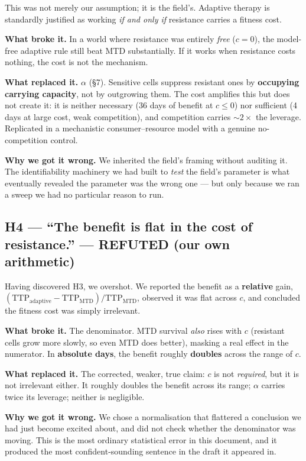 \documentclass[11pt,a4paper]{article}
\begin{document}
This was not merely our assumption; it is the field's. Adaptive therapy is standardly
justified as working \emph{if and only if} resistance carries a fitness cost.

\textbf{What broke it.} In a world where resistance was entirely \emph{free}
($c = 0$), the model-free adaptive rule still beat MTD substantially. If it works when
resistance costs nothing, the cost is not the mechanism.

\textbf{What replaced it.} $\alpha$ (\S7). Sensitive cells suppress resistant ones by
\textbf{occupying carrying capacity}, not by outgrowing them. The cost amplifies this
but does not create it: it is neither necessary (36 days of benefit at $c \leq 0$) nor
sufficient (4 days at large cost, weak competition), and competition carries
${\sim}2\times$ the leverage. Replicated in a mechanistic consumer--resource model with
a genuine no-competition control.

\textbf{Why we got it wrong.} We inherited the field's framing without auditing it. The
identifiability machinery we had built to \emph{test} the field's parameter is what
eventually revealed the parameter was the wrong one --- but only because we ran a sweep
we had no particular reason to run.

\subsection*{H4 --- ``The benefit is flat in the cost of resistance.'' --- \textcolor{red!60!black}{REFUTED (our own arithmetic)}}

Having discovered H3, we overshot. We reported the benefit as a \textbf{relative} gain,
$(\mathrm{TTP}_{\text{adaptive}} - \mathrm{TTP}_{\text{MTD}})/\mathrm{TTP}_{\text{MTD}}$,
observed it was flat across $c$, and concluded the fitness cost was simply irrelevant.

\textbf{What broke it.} The denominator. MTD survival \emph{also} rises with $c$
(resistant cells grow more slowly, so even MTD does better), masking a real effect in
the numerator. In \textbf{absolute days}, the benefit roughly \textbf{doubles} across
the range of $c$.

\textbf{What replaced it.} The corrected, weaker, true claim: $c$ is not
\emph{required}, but it is not irrelevant either. It roughly doubles the benefit across
its range; $\alpha$ carries twice its leverage; neither is negligible.

\textbf{Why we got it wrong.} We chose a normalisation that flattered a conclusion we
had just become excited about, and did not check whether the denominator was moving.
This is the most ordinary statistical error in this document, and it produced the most
confident-sounding sentence in the draft it appeared in.
\end{document}
